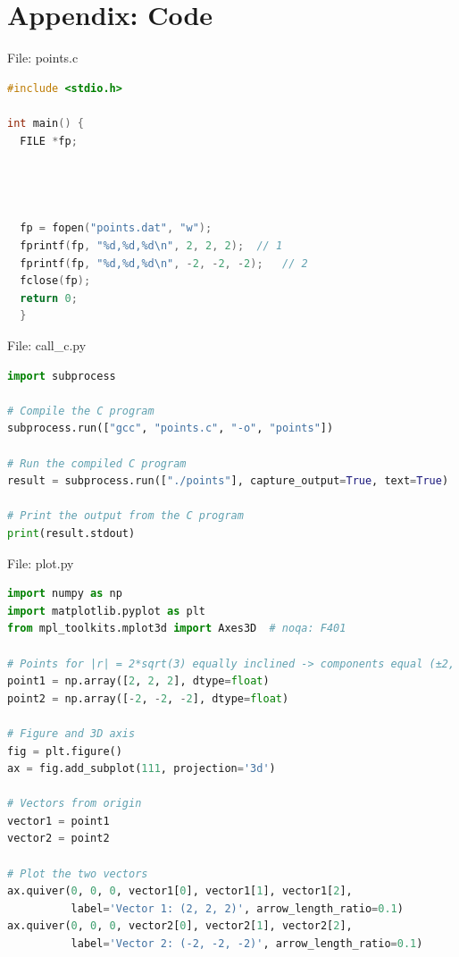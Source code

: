 \documentclass{beamer}
\numberwithin{equation}{section}
\theoremstyle{remark}
\begin{document}
\section*{Appendix: Code}

\begin{frame}[fragile]{File: points.c}
\begin{lstlisting}[language=C]
#include <stdio.h>

int main() {
  FILE *fp;




  fp = fopen("points.dat", "w");
  fprintf(fp, "%d,%d,%d\n", 2, 2, 2);  // 1
  fprintf(fp, "%d,%d,%d\n", -2, -2, -2);   // 2
  fclose(fp);
  return 0;
  }
\end{lstlisting}
\end{frame}

\begin{frame}[fragile]{File: call\_c.py}
\begin{lstlisting}[language=Python]
import subprocess

# Compile the C program
subprocess.run(["gcc", "points.c", "-o", "points"])

# Run the compiled C program
result = subprocess.run(["./points"], capture_output=True, text=True)

# Print the output from the C program
print(result.stdout)
\end{lstlisting}
\end{frame}

\begin{frame}[fragile]{File: plot.py}
\begin{lstlisting}[language=Python]
import numpy as np
import matplotlib.pyplot as plt
from mpl_toolkits.mplot3d import Axes3D  # noqa: F401

# Points for |r| = 2*sqrt(3) equally inclined -> components equal (±2, ±2, ±2)
point1 = np.array([2, 2, 2], dtype=float)
point2 = np.array([-2, -2, -2], dtype=float)

# Figure and 3D axis
fig = plt.figure()
ax = fig.add_subplot(111, projection='3d')

# Vectors from origin
vector1 = point1
vector2 = point2

# Plot the two vectors
ax.quiver(0, 0, 0, vector1[0], vector1[1], vector1[2],
          label='Vector 1: (2, 2, 2)', arrow_length_ratio=0.1)
ax.quiver(0, 0, 0, vector2[0], vector2[1], vector2[2],
          label='Vector 2: (-2, -2, -2)', arrow_length_ratio=0.1)

\end{lstlisting}
\end{frame}
\end{document}
